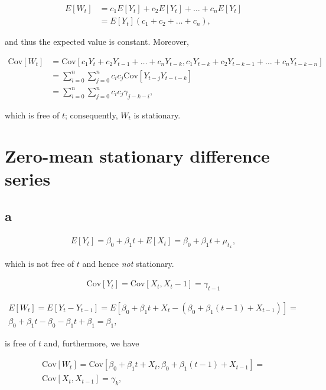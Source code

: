 \documentclass[]{book}
\theoremstyle{definition}
\theoremstyle{definition}
\theoremstyle{remark}
\begin{document}
\begin{align}
  E[W_t] & = c_1E[Y_t]+c_2E[Y_t] + \dots + c_n E[Y_t]\\
         & = E[Y_t](c_1 + c_2 + \dots + c_n),
\end{align}

and thus the expected value is constant. Moreover,

\begin{align}
  \text{Cov}[W_t] & = \text{Cov}[c_1 Y_t + c_2 Y_{t-1} + \dots + c_n Y_{t-k}, c_1 Y_{t-k} + c_2 Y_{t-k-1} + \dots + c_n Y_{t-k-n}] \\
                  & = \sum_{i=0}^n \sum_{j=0}^n c_i c_j \text{Cov}[Y_{t-j}Y_{t-i-k}] \\
                  & = \sum_{i=0}^n \sum_{j=0}^n c_i c_j \gamma_{j-k-i},
\end{align}

which is free of \(t\); consequently, \(W_t\) is stationary.

\section{Zero-mean stationary difference
series}\label{zero-mean-stationary-difference-series}

\subsection*{a}\label{a-6}

\begin{gather*}
  E[Y_t] = \beta_0 + \beta_1 t + E[X_t] = \beta_0 + \beta_1 t + \mu_{t_x},
\end{gather*}

which is not free of \(t\) and hence \emph{not} stationary.

\begin{gather*}
  \text{Cov}[Y_t] = \text{Cov}[X_t, X_t-1] = \gamma_{t-1}
\end{gather*}

\begin{gather*}
  E[W_t] = E[Y_t - Y_{t-1}] = E[\beta_0 + \beta_1 t + X_t - (\beta_0 + \beta_1(t-1) + X_{t-1})] =\\
  \beta_0 + \beta_1 t - \beta_0 - \beta_1 t + \beta_1  = \beta_1,
\end{gather*}

is free of \(t\) and, furthermore, we have

\begin{gather*}
  \text{Cov}[W_t] = \text{Cov}[\beta_0 + \beta_1 t + X_t, \beta_0 + \beta_1 (t-1) + X_{t-1}] =\\
  \text{Cov}[X_t, X_{t-1}] = \gamma_k,  
\end{gather*}
\end{document}
